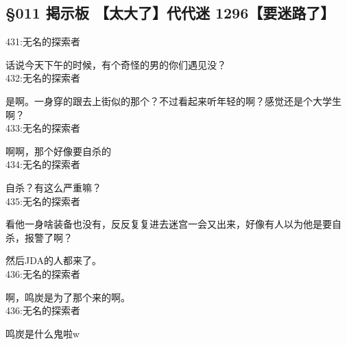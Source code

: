\subsection{§011 掲示板 【太大了】代代迷 1296【要迷路了】}

431:无名的探索者

话说今天下午的时候，有个奇怪的男的你们遇见没？\\

432:无名的探索者

是啊。一身穿的跟去上街似的那个？不过看起来听年轻的啊？感觉还是个大学生啊？\\

433:无名的探索者

啊啊，那个好像要自杀的\\

434:无名的探索者

自杀？有这么严重嘛？\\

435:无名的探索者

看他一身啥装备也没有，反反复复进去迷宫一会又出来，好像有人以为他是要自杀，报警了啊？

然后JDA的人都来了。\\

436:无名的探索者

啊，鸣炭是为了那个来的啊。\\

436:无名的探索者

鸣炭是什么鬼啦w\\

